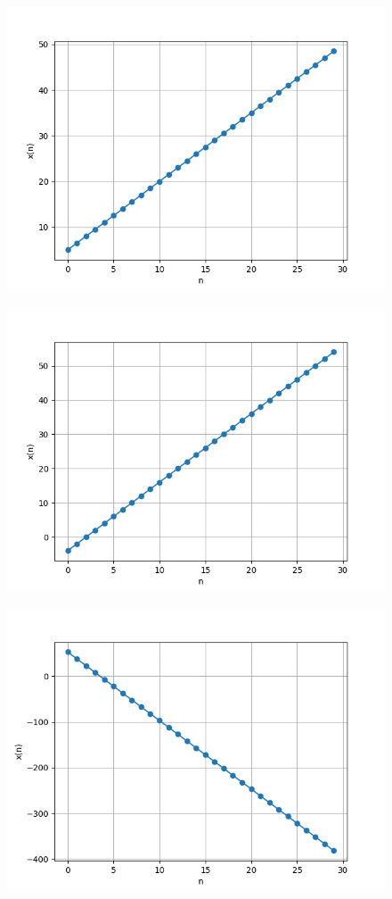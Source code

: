 \documentclass[journal,12pt,twocolumn]{IEEEtran}
\theoremstyle{remark}
\begin{document}
\begin{figure}[h]
      \vspace*{-2cm}
      \centering
       \includegraphics[width=0.8\linewidth]{figs/download (2).png} %
        \caption{}
    \end{figure}
    
\begin{figure}[h]
      \vspace*{-2cm} 
      \centering
       \includegraphics[width=0.8\linewidth]{figs/download (3).png} %
        \caption{}
    \end{figure}
    
\begin{figure}[h]
      \vspace{-2cm}
      \centering
       \includegraphics[width=0.8\linewidth]{figs/download (4).png} %
        \caption{}
\end{figure}
\end{document}
